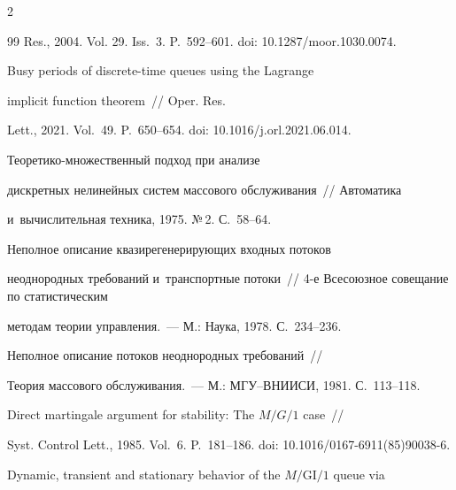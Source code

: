 \begin{multicols}{2}
{{\begin{thebibliography}{99}
    Res., 2004. Vol. 29. Iss.~3. P.~592--601. doi: 10.1287/moor.1030.0074.

    


 Busy periods of discrete-time queues using the Lagrange

    implicit function theorem~// Oper. Res.

    Lett., 2021. Vol.~49. P.~650--654.  doi: 10.1016/j.orl.2021.06.014.

    


 Тео\-ре\-ти\-ко-мно\-жест\-вен\-ный подход при анализе

    дискретных нелинейных систем массового обслуживания~// Автоматика 

    и~вычислительная техника, 1975. №\,2.  С.~58--64.

    


 Неполное описание квазирегенерирующих входных потоков 

неоднородных требований и~транспортные потоки~// 4-е Всесоюзное совещание по статистическим

    методам тео\-рии управ\-ле\-ния.~--- М.: Наука, 1978. С.~234--236.

    


 Неполное описание потоков неоднородных требований~//

     Теория  массового обслуживания.~--- М.: МГУ--ВНИИСИ, 1981. С.~113--118.

     


    



    {Direct martingale argument for stability: The $M/G/1$ case}~//

    Syst. Control Lett., 1985. Vol.~6. P.~181--186. doi: 10.1016/0167-6911(85)90038-6.

    



  {Dynamic, transient and stationary behavior of the $M/\mathrm{GI}/1$ queue via 

}
\end{thebibliography}}}
\end{multicols}
